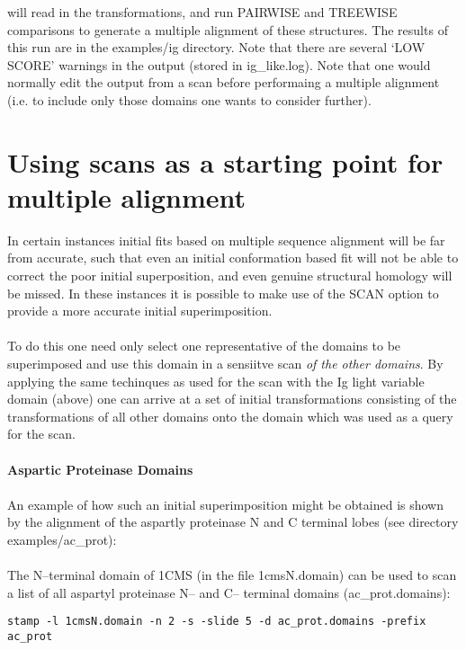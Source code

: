 will read in the transformations, and run PAIRWISE and TREEWISE 
comparisons to generate a multiple alignment of these structures.  The results
of this run are in the examples/ig directory.  Note that there are
several `LOW SCORE' warnings in the output (stored in 
ig\_like.log).  Note that one would normally edit the output from a scan
before performaing a multiple alignment (i.e. to include only those domains
one wants to consider further).



\section{Using scans as a starting point for multiple alignment}

In certain instances initial fits based on multiple sequence
alignment will be far from accurate, such that even an initial
conformation based fit will not be able to correct the poor
initial superposition, and even genuine structural homology will
be missed.  In these instances it is possible to make use of the
SCAN option to provide a more accurate initial superimposition.\\
\\
To do this one need only select one representative of the
domains to be superimposed and use this domain in a sensiitve
scan {\em of the other domains}.  By applying the same techinques as
used for the scan with the Ig  light variable domain (above) one
can arrive at a set of initial transformations consisting of the
transformations of all other domains onto the domain which was
used as a query for the scan.\\
\\
{\bf Aspartic Proteinase Domains}\\
\\
An example of how such an initial superimposition might be
obtained is shown by the alignment of the aspartly proteinase N
and C terminal lobes (see directory examples/ac\_prot):\\
\\
The N--terminal domain of 1CMS (in the file 1cmsN.domain) can be
used to scan a list of all aspartyl proteinase
N-- and C-- terminal domains (ac\_prot.domains):

\begin{scriptsize}\begin{verbatim}
stamp -l 1cmsN.domain -n 2 -s -slide 5 -d ac_prot.domains -prefix ac_prot
\end{verbatim} \end{scriptsize}

